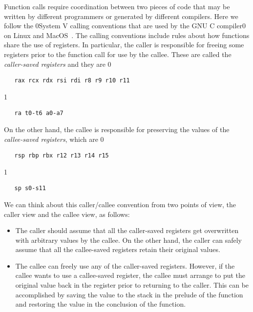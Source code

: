 \documentclass[7x10]{TimesAPriori_MIT}%
\def\xeightysixEd{0}
\def\riscvEd{1}
\def\architecture{1}
\newcommand\ifxeightsix[1]{\if\architecture\xeightysixEd{#1}\fi}
\numberwithin{theorem}{chapter}
\numberwithin{definition}{chapter}
\numberwithin{equation}{chapter}
\begin{document}
Function calls require coordination between two pieces of code that
may be written by different programmers or generated by different
compilers. Here we follow the \ifxeightsix{System V} calling conventions that are
used by the GNU C compiler\ifxeightsix{ on Linux and MacOS~\citep{Bryant:2005aa,Matz:2013aa}}.
%
The calling conventions include rules about how functions share the
use of registers. In particular, the caller is responsible for freeing
some registers prior to the function call for use by the callee.
These are called the \emph{caller-saved registers}
and they are
\if\architecture\xeightysixEd
\begin{lstlisting}
   rax rcx rdx rsi rdi r8 r9 r10 r11
\end{lstlisting}
\fi
\if\architecture\riscvEd
\begin{lstlisting}
   ra t0-t6 a0-a7
\end{lstlisting}
\fi
On the other hand, the callee is responsible for preserving the values
of the \emph{callee-saved registers}, 
which are
\if\architecture\xeightysixEd
\begin{lstlisting}
   rsp rbp rbx r12 r13 r14 r15
\end{lstlisting}
\fi
\if\architecture\riscvEd
\begin{lstlisting}
   sp s0-s11
\end{lstlisting}
\fi

We can think about this caller/callee convention from two points of
view, the caller view and the callee view, as follows:
\begin{itemize}
\item The caller should assume that all the caller-saved registers get
  overwritten with arbitrary values by the callee.  On the other hand,
  the caller can safely assume that all the callee-saved registers
  retain their original values.
\item The callee can freely use any of the caller-saved registers.
  However, if the callee wants to use a callee-saved register, the
  callee must arrange to put the original value back in the register
  prior to returning to the caller. This can be accomplished by saving
  the value to the stack in the prelude of the function and restoring
  the value in the conclusion of the function.
\end{itemize}
\end{document}
